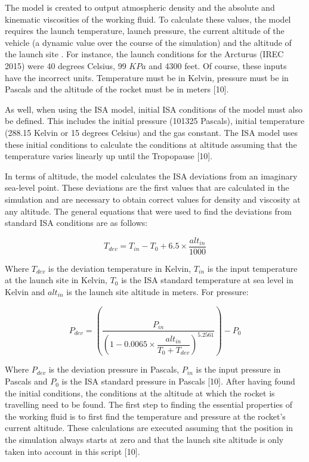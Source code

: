 \documentclass[]{article}
\begin{document}
The model is created to output atmospheric density and the absolute and
kinematic viscosities of the working fluid. To calculate these values,
the model requires the launch temperature, launch pressure, the current
altitude of the vehicle (a dynamic value over the course of the
simulation) and the altitude of the launch site . For instance, the
launch conditions for the Arcturus (IREC 2015) were 40 degrees Celsius,
99 \(KPa\) and 4300 feet. Of course, these inputs have the incorrect
units. Temperature must be in Kelvin, pressure must be in Pascals and
the altitude of the rocket must be in meters {[}10{]}.

As well, when using the ISA model, initial ISA conditions of the model
must also be defined. This includes the initial pressure (101325
Pascals), initial temperature (288.15 Kelvin or 15 degrees Celsius) and
the gas constant. The ISA model uses these initial conditions to
calculate the conditions at altitude assuming that the temperature
varies linearly up until the Tropopause {[}10{]}.

In terms of altitude, the model calculates the ISA deviations from an
imaginary sea-level point. These deviations are the first values that
are calculated in the simulation and are necessary to obtain correct
values for density and viscosity at any altitude. The general equations
that were used to find the deviations from standard ISA conditions are
as follows:

\begin{equation}
T_{dev} = T_{in} - T_0 + 6.5 \times \dfrac{ alt_{in} }{ 1000 }
\end{equation}

Where \(T_{dev}\) is the deviation temperature in Kelvin, \(T_{in}\) is
the input temperature at the launch site in Kelvin, \(T_0\) is the ISA
standard temperature at sea level in Kelvin and \(alt_{in}\) is the
launch site altitude in meters. For pressure:

\begin{equation}
P_{dev} = \left( \dfrac{P_{in}}{ \left( 1-0.0065 \times \dfrac{alt_{in}}{T_0+T_{dev}} \right)^{5.2561} }  \right) - P_0
\end{equation}

Where \(P_{dev}\) is the deviation pressure in Pascals, \(P_{in}\) is
the input pressure in Pascals and \(P_0\) is the ISA standard pressure
in Pascals {[}10{]}. After having found the initial conditions, the
conditions at the altitude at which the rocket is travelling need to be
found. The first step to finding the essential properties of the working
fluid is to first find the temperature and pressure at the rocket's
current altitude. These calculations are executed assuming that the
position in the simulation always starts at zero and that the launch
site altitude is only taken into account in this script {[}10{]}.
\end{document}
